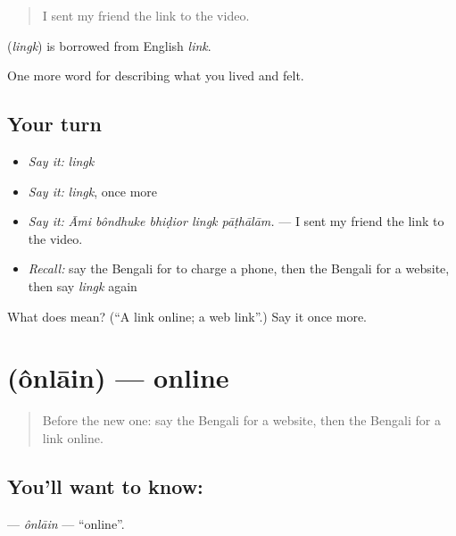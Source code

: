 \begin{quote}
I sent my friend the link to the video.
\end{quote}

\begin{cousinweb}
\textbf{} (\emph{lingk}) is borrowed from English \emph{link}.
\end{cousinweb}

\begin{grammarlens}[title={What you've built}]
One more word for describing what you lived and felt.
\end{grammarlens}

\subsection*{Your turn}
\begin{itemize}
\raggedright
  \item \emph{Say it:} \emph{lingk}
  \item \emph{Say it:} \emph{lingk}, once more
  \item \emph{Say it:} \emph{Āmi bôndhuke bhiḍior lingk pāṭhālām.} — I sent my friend the link to the video.
  \item \emph{Recall:} say the Bengali for to charge a phone, then the Bengali for a website, then say \emph{lingk} again
\end{itemize}

\begin{tcolorbox}[breakable,colback=teal!4,colframe=teal!35!black,title={Before you move on}]
What does  mean? (\textquotedblleft{}A link online; a web link\textquotedblright{}.) Say it once more.
\end{tcolorbox}
\section[\texorpdfstring{\bn{অনলাইন} (ônlāin)}{অনলাইন (ônlāin)}]{ (ônlāin) — online}

\label{lesson:BN-C503-onlain}



\begin{quote}
Before the new one: say the Bengali for a website, then the Bengali for a link online.
\end{quote}

\subsection*{You'll want to know: }
\textbf{} — \emph{ônlāin} — \textquotedblleft{}online\textquotedblright{}.

